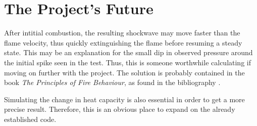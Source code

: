 \chapter{The Project's Future}

After intitial combustion, the resulting shockwave may move faster than the flame velocity, thus quickly extinguishing the flame before resuming a steady state. This may be an explanation for the small dip in observed pressure around the initial spike seen in the test. Thus, this is someone worthwhile calculating if moving on further with the project. The solution is probably contained in the book \emph{The Principles of Fire Behaviour}, as found in the bibliography \cite{principlesoffire}.

Simulating the change in heat capacity is also essential in order to get a more precise result. Therefore, this is an obvious place to expand on the already established code.
